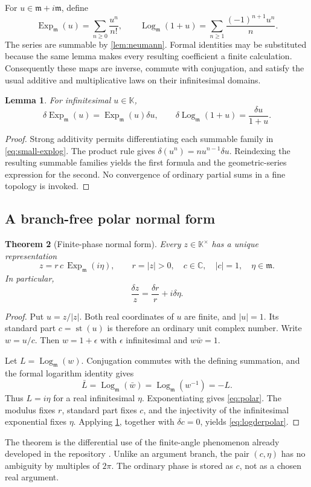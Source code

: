 \documentclass[11pt,letterpaper]{article}
\numberwithin{equation}{section}
\newtheorem{theorem}{Theorem}[section]
\newtheorem{lemma}[theorem]{Lemma}
\theoremstyle{definition}
\theoremstyle{remark}
\newcommand{\K}{\mathbb K}
\newcommand{\C}{\mathbb C}
\newcommand{\mm}{\mathfrak m}
\newcommand{\st}{\operatorname{st}}
\newcommand{\Ex}{\operatorname{Exp}_{\mm}}
\newcommand{\Lm}{\operatorname{Log}_{\mm}}
\begin{document}
For $u\in\mm+i\mm$, define
\begin{equation}\label{eq:small-explog}
 \Ex(u)=\sum_{n\ge0}\frac{u^n}{n!},\qquad
 \Lm(1+u)=\sum_{n\ge1}\frac{(-1)^{n+1}u^n}{n}.
\end{equation}
The series are summable by \cref{lem:neumann}. Formal identities may be substituted because the same lemma makes every resulting coefficient a finite calculation. Consequently these maps are inverse, commute with conjugation, and satisfy the usual additive and multiplicative laws on their infinitesimal domains.

\begin{lemma}\label{lem:diffsmall}
For infinitesimal $u\in\K$,
\[
 \delta\Ex(u)=\Ex(u)\delta u,
 \qquad
 \delta\Lm(1+u)=\frac{\delta u}{1+u}.
\]
\end{lemma}
\begin{proof}
Strong additivity permits differentiating each summable family in \eqref{eq:small-explog}. The product rule gives $\delta(u^n)=nu^{n-1}\delta u$. Reindexing the resulting summable families yields the first formula and the geometric-series expression for the second. No convergence of ordinary partial sums in a fine topology is invoked.
\end{proof}

\subsection{A branch-free polar normal form}
\begin{theorem}[Finite-phase normal form]\label{thm:polar}
Every $z\in\K^\times$ has a unique representation
\begin{equation}\label{eq:polar}
 z=r\,c\,\Ex(i\eta),\qquad
 r=|z|>0,\quad c\in\C,
 \quad |c|=1,\quad\eta\in\mm.
\end{equation}
In particular,
\begin{equation}\label{eq:logderpolar}
 \frac{\delta z}{z}=\frac{\delta r}{r}+i\delta\eta.
\end{equation}
\end{theorem}
\begin{proof}
Put $u=z/|z|$. Both real coordinates of $u$ are finite, and $|u|=1$. Its standard part $c=\st(u)$ is therefore an ordinary unit complex number. Write $w=u/c$. Then $w=1+\epsilon$ with $\epsilon$ infinitesimal and $w\bar w=1$.

Let $L=\Lm(w)$. Conjugation commutes with the defining summation, and the formal logarithm identity gives
\[
 \bar L=\Lm(\bar w)=\Lm(w^{-1})=-L.
\]
Thus $L=i\eta$ for a real infinitesimal $\eta$. Exponentiating gives \eqref{eq:polar}. The modulus fixes $r$, standard part fixes $c$, and the injectivity of the infinitesimal exponential fixes $\eta$. Applying \cref{lem:diffsmall}, together with $\delta c=0$, yields \eqref{eq:logderpolar}.
\end{proof}
The theorem is the differential use of the finite-angle phenomenon already developed in the repository \cite{RepoTrig}. Unlike an argument branch, the pair $(c,\eta)$ has no ambiguity by multiples of $2\pi$. The ordinary phase is stored as $c$, not as a chosen real argument.
\end{document}
